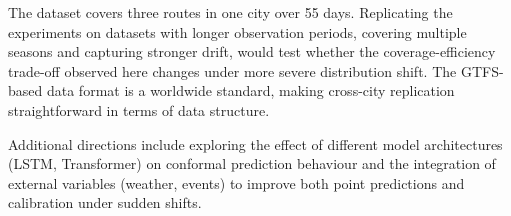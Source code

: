 \documentclass[12pt, a4paper, oneside]{report}
\begin{document}
The dataset covers three routes in one city over 55 days. Replicating the experiments on datasets with longer observation periods, covering multiple seasons and capturing stronger drift, would test whether the coverage-efficiency trade-off observed here changes under more severe distribution shift. The GTFS-based data format is a worldwide standard, making cross-city replication straightforward in terms of data structure.

Additional directions include exploring the effect of different model architectures (LSTM, Transformer) on conformal prediction behaviour and the integration of external variables (weather, events) to improve both point predictions and calibration under sudden shifts.



\end{document}
